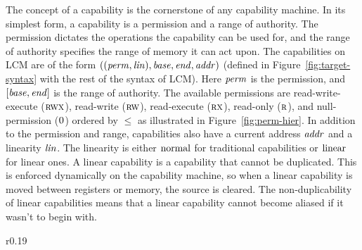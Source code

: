 \documentclass[acmsmall,screen]{acmart}\settopmatter{}
\newcommand{\trgcm}{\textsc{LCM}}
\begin{document}
The concept of a capability is the cornerstone of any capability machine.
In its simplest form, a capability is a permission and a range of authority.
The permission dictates the operations the capability can be used for, and the range of authority specifies the range of memory it can act upon.
The capabilities on \trgcm{} are of the form $((\mathit{perm},\mathit{lin}),\mathit{base},\mathit{end},\mathit{addr})$ (defined in Figure~\ref{fig:target-syntax} with the rest of the syntax of \trgcm{}). Here $\mathit{perm}$ is the permission, and $[\mathit{base},\mathit{end}]$ is the range of authority.
The available permissions are read-write-execute ($\textsc{rwx}$), read-write ($\textsc{rw}$), read-execute ($\textsc{rx}$), read-only ($\textsc{r}$), and null-permission ($\textsc{0}$) ordered by $\le$ as illustrated in Figure~\ref{fig:perm-hier}.
In addition to the permission and range, capabilities also have a current address $\mathit{addr}$ and a linearity $\mathit{lin}$.
The linearity is either $\mathrm{normal}$ for traditional capabilities or $\mathrm{linear}$ for linear ones.
A linear capability is a capability that cannot be duplicated.
This is enforced dynamically on the capability machine, so when a linear capability is moved between registers or memory, the source is cleared.
The non-duplicability of linear capabilities means that a linear capability cannot become aliased if it wasn't to begin with.

\begin{wrapfigure}{r}{0.19\linewidth}
  \centering

  \caption{Permission hierarchy}
  \label{fig:perm-hier}
\end{wrapfigure}%
%
\end{document}
